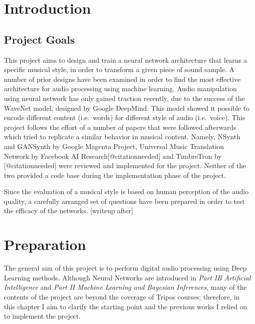 \documentclass[]{report}
\date{}
\begin{document}
\hypertarget{introduction}{%
\chapter{Introduction}\label{introduction}}

\hypertarget{project-goals}{%
\section{Project Goals}\label{project-goals}}

This project aims to design and train a neural network architecture that
learns a specific musical style, in order to transform a given piece of
sound sample. A number of prior designs have been examined in order to
find the most effective architecture for audio processing using machine
learning. Audio manipulation using neural network has only gained
traction recently, due to the success of the WaveNet model, designed by
Google DeepMind. This model showed it possible to encode different
content (i.e.~words) for different style of audio (i.e.~voice). This
project follows the effort of a number of papers that were followed
afterwards which tried to replicate a similar behavior in musical
content. Namely, NSynth and GANSynth by Google Magenta Project,
Universal Music Translation Network by Facebook AI
Research{[}@citationneeded{]} and TimbreTron by {[}@citationneeded{]}
were reviewed and implemented for the project. Neither of the two
provided a code base during the implementation phase of the project.

Since the evaluation of a musical style is based on human perception of
the audio quality, a carefully arranged set of questions have been
prepared in order to test the efficacy of the networks. {[}writeup
after{]}

\hypertarget{preparation}{%
\chapter{Preparation}\label{preparation}}

The general aim of this project is to perform digital audio processing
using Deep Learning methods. Although Neural Networks are introduced in
\emph{Part IB Artificial Intelligence} and \emph{Part II Machine
Learning and Bayesian Inferences}, many of the contents of the project
are beyond the coverage of Tripos courses; therefore, in this chapter I
aim to clarify the starting point and the previous works I relied on to
implement the project.
\end{document}
